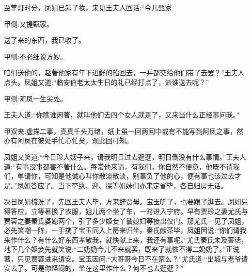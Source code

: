 \begin{parag}
    至掌灯时分，凤姐已卸了妆，来见王夫人回话:“今儿甄家\begin{note}甲侧:又提甄家。\end{note}送了来的东西，我已收了。\begin{note}甲侧:不必细说方妙。\end{note}咱们送他的，趁著他家有年下进鲜的船回去，一并都交给他们带了去罢？”王夫人点头。凤姐又道:“临安伯老太太生日的礼已经打点了，派谁送去呢？”\begin{note}甲侧:阿凤一生尖处。\end{note}王夫人道:“你瞧谁闲著，就叫他们去四个女人就是了，又来当什么正经事问我。”\begin{note}甲双夹:虚描二事，真真千头万绪，纸上虽一回两回中或有不能写到阿凤之事，然亦有阿凤在彼处手忙心忙矣，观此回可知。\end{note}凤姐又笑道:“今日珍大嫂子来，请我明日过去逛逛，明日倒没有什么事情。”王夫人道:“有事没事都害不著什么。每常他来请，有我们，你自然不便意，他既不请我们，单请你，可知是他诚心叫你散淡散淡，别辜负了他的心，便有事也该过去才是。”凤姐答应了。当下李纨、迎、探等姐妹们亦来定省毕，各自归房无话。
\end{parag}


\begin{parag}
    次日凤姐梳洗了，先回王夫人毕，方来辞贾母。宝玉听了，也要跟了逛去。凤姐只得答应，立等著换了衣服，姐儿两个坐了车，一时进入宁府。早有贾珍之妻尤氏与贾蓉之妻秦氏婆媳两个，引了多少姬妾丫鬟媳妇等接出仪门。那尤氏一见了凤姐，必先笑嘲一阵，一手携了宝玉同入上房来归坐。秦氏献茶毕，凤姐因说:“你们请我来作什么？有什么好东西孝敬我，就快献上来，我还有事呢。”尤氏秦氏未及答话，地下几个姬妾先就笑说:“二奶奶今儿不来就罢，既来了就依不得二奶奶了。”正说著，只见贾蓉进来请安。宝玉因问:“大哥哥今日不在家么？”尤氏道:“出城与老爷请安去了。可是你怪闷的，坐在这里作什么？何不也去逛逛？”
\end{parag}


